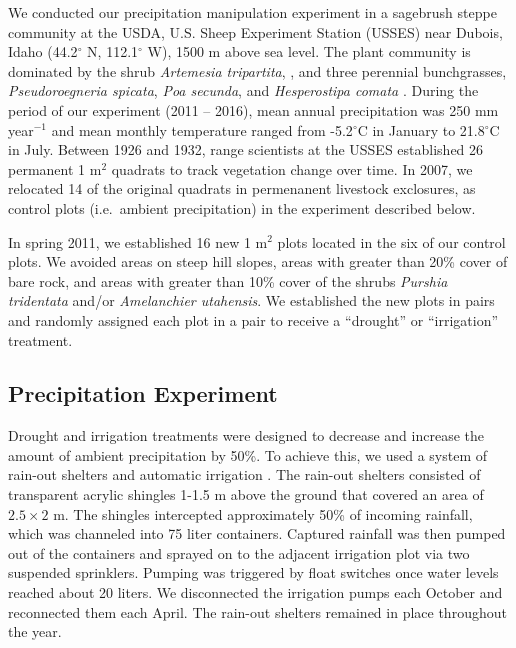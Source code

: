 \documentclass[fleqn,10pt,lineno]{wlpeerj} %
\begin{document}
We conducted our precipitation manipulation experiment in a sagebrush
steppe community at the USDA, U.S. Sheep Experiment Station (USSES) near
Dubois, Idaho (44.2\(^{\circ}\) N, 112.1\(^{\circ}\) W), 1500 m above
sea level. The plant community is dominated by the shrub
\emph{Artemesia tripartita},
, and three
perennial bunchgrasses, \emph{Pseudoroegneria spicata},
\emph{Poa secunda}, and \emph{Hesperostipa comata}
. During the period of
our experiment (2011 -- 2016), mean annual precipitation was 250 mm
year\(\phantom{}^{-1}\) and mean monthly temperature ranged from
-5.2\(^{\circ}\)C in January to 21.8\(^{\circ}\)C in July. Between 1926
and 1932, range scientists at the USSES established 26 permanent 1
m\(^2\) quadrats to track vegetation change over time. In 2007, we
relocated 14 of the original quadrats in permenanent livestock
exclosures,  as control plots (i.e.~ambient
precipitation) in the experiment described below.

In spring 2011, we established 16 new 1 m\(^2\) plots located in the
 six of our
control plots. We avoided areas on steep hill slopes, areas with greater
than 20\% cover of bare rock, and areas with greater than 10\% cover of
the shrubs \emph{Purshia tridentata} and/or
\emph{Amelanchier utahensis}. We established the new plots in pairs and
randomly assigned each plot in a pair to receive a ``drought'' or
``irrigation'' treatment.

\subsection{Precipitation Experiment}\label{precipitation-experiment}

Drought and irrigation treatments were designed to decrease and increase
the amount of ambient precipitation by 50\%. To achieve this, we used a
system of rain-out shelters and automatic irrigation
\citep{Gherardi2013}. The rain-out shelters consisted of transparent
acrylic shingles 1-1.5 m above the ground that covered an area of
\(2.5\times2\) m. The shingles intercepted approximately 50\% of
incoming rainfall, which was channeled into 75 liter containers.
Captured rainfall was then pumped out of the containers and sprayed on
to the adjacent irrigation plot via two suspended sprinklers. Pumping
was triggered by float switches once water levels reached about 20
liters. We disconnected the irrigation pumps each October and
reconnected them each April. The rain-out shelters remained in place
throughout the year.
\end{document}
